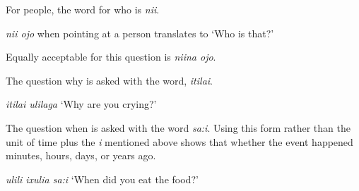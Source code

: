 For people, the word for who is \emph{ni\beta{}i}.
\begin{wrdex} \item \emph{ni\beta{}i ojo} when pointing at a person translates to `Who is that?'  \item Equally acceptable for this question is \emph{ni\beta{}ina ojo}. \end{wrdex}

The question why is asked with the word, \emph{\esh{}it\esh{}ila\esh{}i}.
\begin{wrdex} \item \emph{\esh{}it\esh{}ila\esh{}i ulila\engma{}ga} `Why are you crying?' \end{wrdex}

The question when is asked with the word \emph{sa:\esh{}i}.  Using this form rather than the unit of time plus the \emph{\esh{}i} mentioned above shows that whether the event happened minutes, hours, days, or years ago.
\begin{wrdex} \item \emph{ulili \esh{}ixulia sa:\esh{}i} `When did you eat the food?' \end{wrdex}